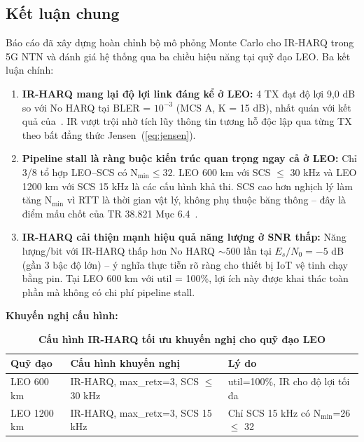 \subsection*{Kết luận chung}

Báo cáo đã xây dựng hoàn chỉnh bộ mô phỏng Monte Carlo cho IR-HARQ trong 5G NTN và đánh giá hệ thống qua ba chiều hiệu năng tại quỹ đạo LEO. Ba kết luận chính:

\begin{enumerate}
    \item \textbf{IR-HARQ mang lại độ lợi link đáng kể ở LEO:} 4 TX đạt độ lợi 9{,}0 dB so với No HARQ tại BLER = $10^{-3}$ (MCS A, K = 15 dB), nhất quán với kết quả của~\cite{tuninato2025}. IR vượt trội nhờ tích lũy thông tin tương hỗ độc lập qua từng TX theo bất đẳng thức Jensen~(\ref{eq:jensen}).

    \item \textbf{Pipeline stall là ràng buộc kiến trúc quan trọng ngay cả ở LEO:} Chỉ 3/8 tổ hợp LEO--SCS có N$_{\min} \leq 32$. LEO 600 km với SCS $\leq$ 30 kHz và LEO 1200 km với SCS 15 kHz là các cấu hình khả thi. SCS cao hơn nghịch lý làm tăng N$_{\min}$ vì RTT là thời gian vật lý, không phụ thuộc băng thông -- đây là điểm mấu chốt của TR 38.821 Mục 6.4~\cite{tr38821}.

    \item \textbf{IR-HARQ cải thiện mạnh hiệu quả năng lượng ở SNR thấp:} Năng lượng/bit với IR-HARQ thấp hơn No HARQ $\sim 500$ lần tại $E_s/N_0 = -5$ dB (gần 3 bậc độ lớn) -- ý nghĩa thực tiễn rõ ràng cho thiết bị IoT vệ tinh chạy bằng pin. Tại LEO 600 km với util = 100\%, lợi ích này được khai thác toàn phần mà không có chi phí pipeline stall.
\end{enumerate}

\textbf{Khuyến nghị cấu hình:}

\begin{table}[H]
    \centering
    \caption[Cấu hình IR-HARQ khuyến nghị theo quỹ đạo LEO]{\bfseries\fontsize{12pt}{0pt}\selectfont
    Cấu hình IR-HARQ tối ưu khuyến nghị cho quỹ đạo LEO}
    \label{tab:recommendation}
    \begin{tabularx}{0.98\textwidth}{
    | >{\centering\arraybackslash}X
    | >{\centering\arraybackslash}X
    | >{\centering\arraybackslash}X |}
    \hline
    \bfseries Quỹ đạo & \bfseries Cấu hình khuyến nghị & \bfseries Lý do \\\hline
    LEO 600 km & IR-HARQ, max\_retx=3, SCS $\leq$ 30 kHz & util=100\%, IR cho độ lợi tối đa \\\hline
    LEO 1200 km & IR-HARQ, max\_retx=3, SCS 15 kHz & Chỉ SCS 15 kHz có N$_{\min}$=26 $\leq$ 32 \\\hline
    \end{tabularx}
\end{table}

